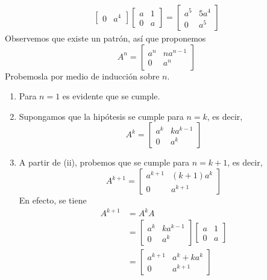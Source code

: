 \begin{example}
\begin{align*}
\begin{bmatrix}
            0 & a^4
        \end{bmatrix} \begin{bmatrix}
            a & 1 \\
            0 & a
        \end{bmatrix} = \begin{bmatrix}
            a^5 & 5a^4 \\
            0 & a^5
        \end{bmatrix}
    \end{align*}
    Observemos que existe un patrón, así que proponemos
    $$A^n = \begin{bmatrix}
        a^n & na^{n-1} \\
        0 & a^n
    \end{bmatrix}$$
    Probemosla por medio de inducción sobre $n$.
    \begin{enumerate}[label=\roman*.]
        \item Para $n = 1$ es evidente que se cumple.
        \item Supongamos que la hipótesis se cumple para $n = k$, es decir,
        $$A^k = \begin{bmatrix}
            a^k & ka^{k-1} \\
            0 & a^k
        \end{bmatrix}$$
        \item A partir de (ii), probemos que se cumple para $n = k + 1$, es decir,
        $$A^{k+1} = \begin{bmatrix}
            a^{k+1} & (k+1)a^k \\
            0 & a^{k+1}
        \end{bmatrix}$$
        En efecto, se tiene
        \begin{align*}
            A^{k+1} & = A^k A \\
            & = \begin{bmatrix}
                a^k & ka^{k-1} \\
                0 & a^k
            \end{bmatrix} \begin{bmatrix}
                a & 1 \\
                0 & a
            \end{bmatrix} \\
            & = \begin{bmatrix}
                a^{k+1} & a^k + ka^k \\
                0 & a^{k+1}
            \end{bmatrix} \\

\end{align*}
\end{enumerate}
\end{example}
